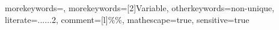  {
  morekeywords={},
  morekeywords=[2]{Variable},
  otherkeywords={non-unique}, %
  literate={...}{$\ldots$}2,
  comment=[l]{\%\%},
  mathescape=true,
  sensitive=true
}

\newcommand{\atermcode}[1]{\lstinline[language=ATerm,basicstyle=\lstinlinestyle]{#1}}
